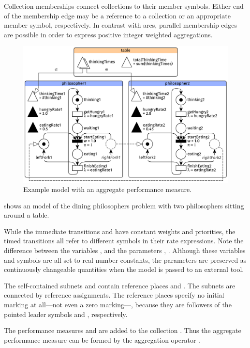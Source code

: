 Collection memberships connect collections to their member symbols. Either end of the membership edge may be a reference to a collection or an appropriate member symbol, respectively. In contrast with arcs, parallel membership edges are possible in order to express positive integer weighted aggregations.

\begin{figure}
  \centering
  \includegraphics[scale=0.9]{figures/rgspn_example}
  \caption{Example  model with an aggregate performance measure.}
  \label{fig:rgspn:example}
\end{figure}

\begin{runningExample}
  \label{ex:rgspn:example}
   shows an  model of the dining philosophers problem with two philosophers sitting around a table.

  While the immediate transitions  and  have constant weights and priorities, the timed transitions all refer to different symbols in their rate expressions. Note the difference between the variables ,  and the parameters , . Although these variables and symbols are all set to real number constants, the parameters are preserved as continuously changeable quantities when the model is passed to an external tool.

  The self-contained subnets  and  contain reference places  and . The subnets are connected by reference assignments. The reference places specify no initial marking at all---not even a zero marking---, because they are followers of the pointed leader symbols  and , respectively.

  The performance measures  and  are added to the collection . Thus the aggregate performance measure  can be formed by the aggregation operator .
\end{runningExample}

